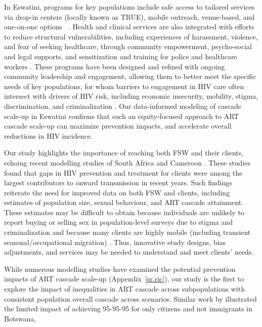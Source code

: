 \par
In Eswatini, programs for key populations include safe access to tailored services via
drop-in centers (locally known as TRUE), mobile outreach, venue-based, and one-on-one options~%
\cite{EswIBBS2022}.
Health and clinical services are also integrated with
efforts to reduce structural vulnerabilities, including
experiences of harassment, violence, and fear of seeking healthcare,
through community empowerment, psycho-social and legal supports, and
sensitization and training for police and healthcare workers \cite{EswIBBS2022}.
These programs have been designed and refined with ongoing community leadership and engagement,
allowing them to better meet the specific needs of key populations,
for whom barriers to engagement in HIV care often intersect with drivers of HIV risk,
including economic insecurity, mobility, stigma, discrimination, and criminalization
\cite{Lancaster2016sr,Wanyenze2016,Schwartz2017,Schmidt-Sane2022,Camlin2019,Baral2019}.
Our data-informed modeling of cascade scale-up in Eswatini confirms that
such an equity-focused approach to ART cascade scale-up
can maximize prevention impacts, and accelerate overall reductions in HIV incidence.
\par
Our study highlights the importance of reaching both FSW and their clients,
echoing recent modelling studies of South Africa and Cameroon \cite{Stone2021,Silhol2024}.
These studies found that gaps in HIV prevention and treatment for clients
were among the largest contributors to onward transmission in recent years.
Such findings reiterate the need for improved data on both FSW and clients,
including estimates of population size, sexual behaviour, and ART cascade attainment.
These estimates may be difficult to obtain
because individuals are unlikely to report buying or selling sex in population-level surveys
due to stigma and criminalization \cite{Behanzin2013} and
because many clients are highly mobile
(including transient seasonal/occupational migration) \cite{Camlin2019}.
Thus, innovative study designs, bias adjustments, and services may be needed
to understand and meet clients' needs.
\par
While numerous modelling studies have examined
the potential prevention impacts of ART cascade scale-up
\cite{Knight2022sr} (Appendix~\ref{sr.ric}),
our study is the first to explore the impact of
inequalities in ART cascade across subpopulations
with consistent population overall cascade across scenarios.
Similar work by \citet{Marukutira2020} illustrated the limited impact of
achieving 95-95-95 for only citizens and not immigrants in Botswana,
